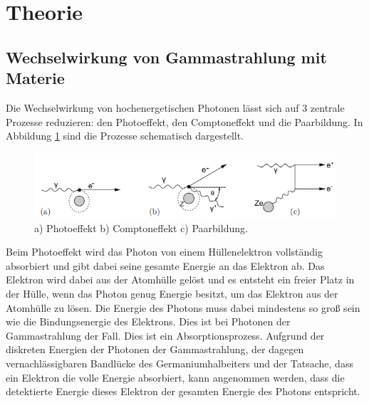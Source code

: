 \section{Theorie}
\label{sec:Theorie}
\subsection{Wechselwirkung von Gammastrahlung mit Materie}
Die Wechselwirkung von hochenergetischen Photonen lässt sich auf 3 zentrale Prozesse reduzieren: den Photoeffekt, den Comptoneffekt und die Paarbildung.
In Abbildung \ref{fig:Wechselwirkung} sind die Prozesse schematisch dargestellt.
\begin{figure}[H]
    \centering
    \includegraphics[scale=1.0]{illustration/WWPhoton.png}
    \caption{a) Photoeffekt b) Comptoneffekt c) Paarbildung.\cite{Detektor}}
    \label{fig:Wechselwirkung}
\end{figure}
\noindent Beim Photoeffekt wird das Photon von einem Hüllenelektron vollständig absorbiert und gibt dabei seine gesamte Energie an das Elektron ab. Das Elektron wird dabei aus der Atomhülle gelöst und es entsteht ein freier Platz in der Hülle, 
wenn das Photon genug Energie besitzt, um das Elektron aus der Atomhülle zu lösen. Die Energie des Photons muss dabei mindestens so groß sein wie die Bindungsenergie des Elektrons.
Dies ist bei Photonen der Gammastrahlung der Fall. Dies ist ein Absorptionsprozess. Aufgrund der diskreten Energien der Photonen der Gammastrahlung, der dagegen vernachlässigbaren Bandlücke des Germaniumhalbeiters und 
der Tatsache, dass ein Elektron die volle Energie absorbiert, kann angenommen werden, dass die detektierte Energie dieses Elektron der gesamten 
Energie des Photons entspricht.

